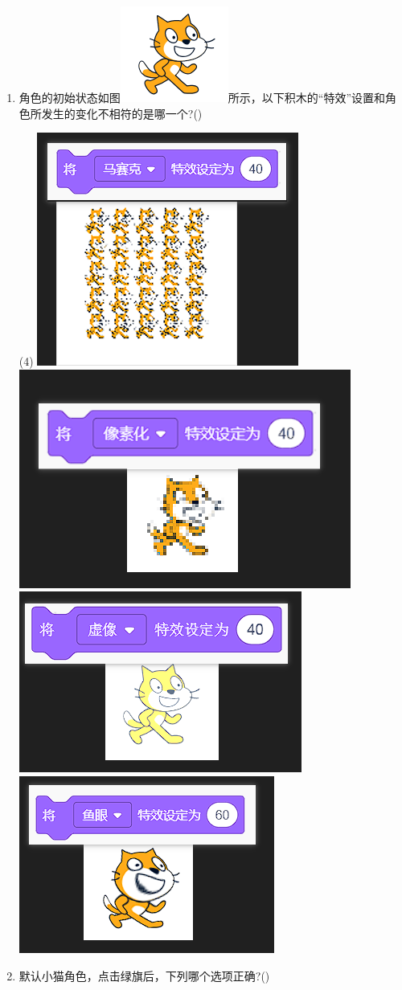 \documentclass[10pt, a4paper]{article}
\begin{document}
\begin{enumerate}
        \item 角色的初始状态如图\includegraphics[width=.1\textwidth]{10.png}所示，以下积木的“特效”设置和角色所发生的变化不相符的是哪一个?(\qquad)
        \begin{tasks}(4)
            \task \includegraphics[width=.15\textwidth]{10a.png}
            \task \includegraphics[width=.18\textwidth]{10b.png}
            \task \includegraphics[width=.18\textwidth]{10c.png}
            \task \includegraphics[width=.18\textwidth]{10d.png}
        \end{tasks}

        \item 默认小猫角色，点击绿旗后，下列哪个选项正确?(\qquad)
        

\end{enumerate}
\end{document}
